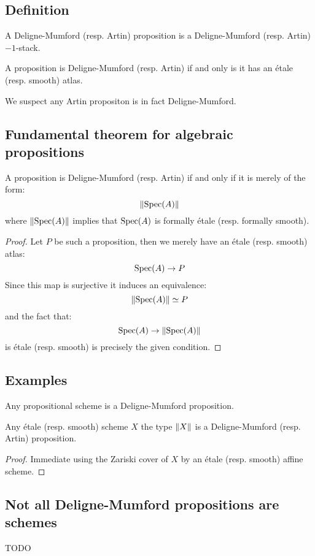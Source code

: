 \subsection{Definition}

\begin{definition}
A Deligne-Mumford (resp. Artin) proposition is a Deligne-Mumford (resp. Artin) $-1$-stack.
\end{definition}

\begin{remark}
A proposition is Deligne-Mumford (resp. Artin) if and only is it has an étale (resp. smooth) atlas.
\end{remark}

We suspect any Artin propositon is in fact Deligne-Mumford.

\subsection{Fundamental theorem for algebraic propositions}

\begin{proposition}
A proposition is Deligne-Mumford (resp. Artin) if and only if it is merely of the form:
\[\lVert \operatorname{Spec}(A) \rVert\]
where $\lVert \operatorname{Spec}(A) \rVert$ implies that $\operatorname{Spec}(A)$ is formally étale (resp. formally smooth).
\end{proposition}

\begin{proof}
Let $P$ be such a proposition, then we merely have an étale (resp. smooth) atlas:
\[\operatorname{Spec}(A)\to P\]
Since this map is surjective it induces an equivalence:
\[\lVert \operatorname{Spec}(A) \rVert \simeq P\]
and the fact that:
\[\operatorname{Spec}(A)\to \lVert \operatorname{Spec}(A) \rVert\]
is étale (resp. smooth) is precisely the given condition.
\end{proof}

\subsection{Examples}

\begin{remark}
Any propositional scheme is a Deligne-Mumford proposition.
\end{remark}

\begin{lemma}
Any étale (resp. smooth) scheme $X$ the type $\lVert X \rVert$ is a Deligne-Mumford (resp. Artin) proposition.
\end{lemma}

\begin{proof}
Immediate using the Zariski cover of $X$ by an étale (resp. smooth) affine scheme.
\end{proof}

\subsection{Not all Deligne-Mumford propositions are schemes}

TODO
